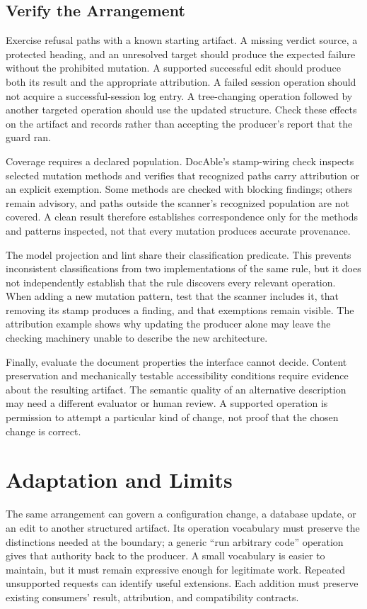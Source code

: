 \subsection*{Verify the Arrangement}

Exercise refusal paths with a known starting artifact. A missing verdict source, a protected heading, and an unresolved target should produce the expected failure without the prohibited mutation. A supported successful edit should produce both its result and the appropriate attribution. A failed session operation should not acquire a successful-session log entry. A tree-changing operation followed by another targeted operation should use the updated structure. Check these effects on the artifact and records rather than accepting the producer's report that the guard ran.

Coverage requires a declared population. DocAble's stamp-wiring check inspects selected mutation methods and verifies that recognized paths carry attribution or an explicit exemption. Some methods are checked with blocking findings; others remain advisory, and paths outside the scanner's recognized population are not covered. A clean result therefore establishes correspondence only for the methods and patterns inspected, not that every mutation produces accurate provenance.

The model projection and lint share their classification predicate. This prevents inconsistent classifications from two implementations of the same rule, but it does not independently establish that the rule discovers every relevant operation. When adding a new mutation pattern, test that the scanner includes it, that removing its stamp produces a finding, and that exemptions remain visible. The attribution example shows why updating the producer alone may leave the checking machinery unable to describe the new architecture.

Finally, evaluate the document properties the interface cannot decide. Content preservation and mechanically testable accessibility conditions require evidence about the resulting artifact. The semantic quality of an alternative description may need a different evaluator or human review. A supported operation is permission to attempt a particular kind of change, not proof that the chosen change is correct.

\section{Adaptation and Limits}

The same arrangement can govern a configuration change, a database update, or an edit to another structured artifact. Its operation vocabulary must preserve the distinctions needed at the boundary; a generic ``run arbitrary code'' operation gives that authority back to the producer. A small vocabulary is easier to maintain, but it must remain expressive enough for legitimate work. Repeated unsupported requests can identify useful extensions. Each addition must preserve existing consumers' result, attribution, and compatibility contracts.
